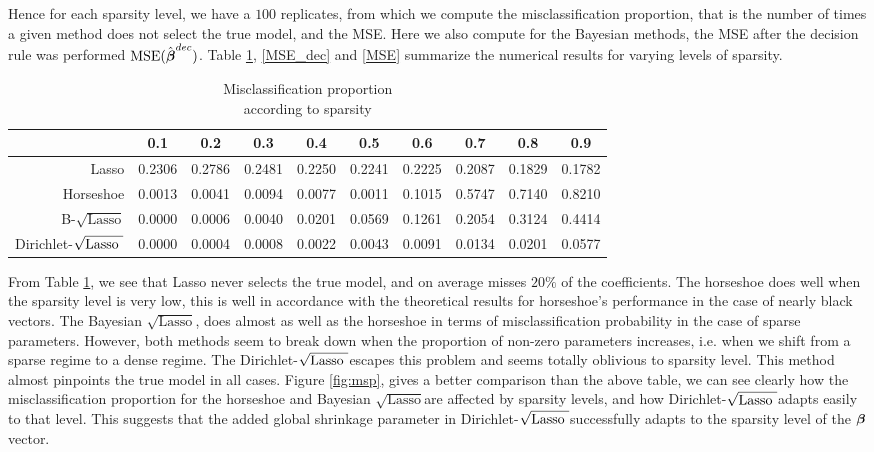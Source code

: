 \documentclass[10pt]{article}
\def\sql{$\sqrt{\text{Lasso}}$}
\def\sqdl{Dirichlet-$\sqrt{\text{\rm{Lasso} }}$}
\begin{document}
Hence for each sparsity level, we have a $100$ replicates, from which we compute the misclassification proportion, that is the number of times a given method does not select the true model, and the MSE. Here we also compute for the Bayesian methods, the MSE after the decision rule was performed $\textbf{\rm{MSE}}(\hat{\boldsymbol{\beta}}^{dec})$. Table \ref{table:msp}, \ref{MSE_dec} and \ref{MSE} summarize the numerical results for varying levels of sparsity. 


\begin{table}[h!]
\caption{Misclassification proportion \\ according to sparsity}\label{table:msp}
\begin{center}
\footnotesize{
\begin{tabular}{c|c|c|c|c|c|c|c|c|c|}
\cline{2-10}
    & 0.1  &  0.2  &  0.3  &  0.4  &  0.5 &   0.6  &  0.7  &  0.8 &   0.9 	\\
\hline
\multicolumn{1}{|r|}{Lasso} &  0.2306 & 0.2786 & 0.2481 & 0.2250 & 0.2241 & 0.2225 & 0.2087 & 0.1829 & 0.1782	\\
\hline
\multicolumn{1}{|r|}{Horseshoe} &  0.0013 & 0.0041 & 0.0094 & 0.0077 & 0.0011 & 0.1015 & 0.5747 & 0.7140 & 0.8210\\
\hline
\multicolumn{1}{|r|}{B-\sql} & 0.0000 & 0.0006 & 0.0040 & 0.0201 & 0.0569 & 0.1261 & 0.2054 & 0.3124 & 0.4414 \\
\hline
\multicolumn{1}{|r|}{\sqdl} & 0.0000 & 0.0004 & 0.0008 & 0.0022 & 0.0043 & 0.0091 & 0.0134 & 0.0201 & 0.0577 \\
\hline
\end{tabular}}
\end{center}

\end{table}

From Table \ref{table:msp}, we see that Lasso never selects the true model, and on average misses $20 \% $ of the coefficients. The horseshoe does well when the sparsity  level is very low, this is well in accordance with the theoretical results for horseshoe's performance in the case of nearly black vectors. The Bayesian \sql, does almost as well as the horseshoe in terms of misclassification probability in the case of sparse parameters. However, both methods seem to break down when the proportion of non-zero parameters increases, i.e. when we shift from a sparse regime to a dense regime. The \sqdl escapes this problem and seems totally oblivious to sparsity level. This method almost pinpoints the true model in all cases. Figure \ref{fig:msp}, gives a better comparison than the above table, we can see clearly how the misclassification proportion for the horseshoe and Bayesian \sql are affected by sparsity levels, and how \sqdl adapts easily to that level. This suggests that the added global shrinkage parameter in \sqdl  successfully adapts to the sparsity level of the $\boldsymbol{\beta}$ vector. 
\end{document}
